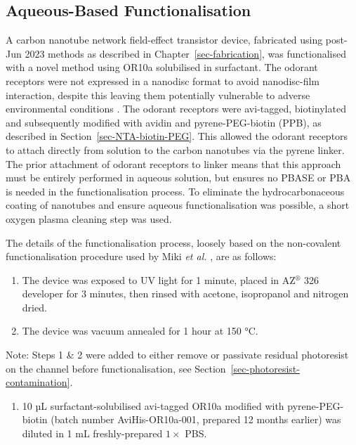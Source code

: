 \documentclass[
  a4paper,
]{scrbook}
\providecommand{\tightlist}{%
  \setlength{\itemsep}{0pt}\setlength{\parskip}{0pt}}\usepackage{longtable,booktabs,array}
\begin{document}
\hypertarget{sec-aqueous-functionalisation}{%
\subsection{Aqueous-Based
Functionalisation}\label{sec-aqueous-functionalisation}}

A carbon nanotube network field-effect transistor device, fabricated
using post-Jun 2023 methods as described in
Chapter~\ref{sec-fabrication}, was functionalised with a novel method
using OR10a solubilised in surfactant. The odorant receptors were not
expressed in a nanodisc format to avoid nanodisc-film interaction,
despite this leaving them potentially vulnerable to adverse
environmental conditions \autocite{Nath2007,Bayburt2010}. The odorant
receptors were avi-tagged, biotinylated and subsequently modified with
avidin and pyrene-PEG-biotin (PPB), as described in
Section~\ref{sec-NTA-biotin-PEG}. This allowed the odorant receptors to
attach directly from solution to the carbon nanotubes via the pyrene
linker. The prior attachment of odorant receptors to linker means that
this approach must be entirely performed in aqueous solution, but
ensures no PBASE or PBA is needed in the functionalisation process. To
eliminate the hydrocarbonaceous coating of nanotubes and ensure aqueous
functionalisation was possible, a short oxygen plasma cleaning step was
used.

The details of the functionalisation process, loosely based on the
non-covalent functionalisation procedure used by Miki \emph{et al.}
\autocite{Miki2019}, are as follows:

\begin{enumerate}
\def\labelenumi{\arabic{enumi}.}
\item
  The device was exposed to UV light for 1 minute, placed in
  AZ\(^\circledR\) 326 developer for 3 minutes, then rinsed with
  acetone, isopropanol and nitrogen dried.
\item
  The device was vacuum annealed for 1 hour at 150 °C.
\end{enumerate}

Note: Steps 1 \& 2 were added to either remove or passivate residual
photoresist on the channel before functionalisation, see
Section~\ref{sec-photoresist-contamination}.

\begin{enumerate}
\def\labelenumi{\arabic{enumi}.}
\setcounter{enumi}{2}
\tightlist
\item
  10 µL surfactant-solubilised avi-tagged OR10a modified with
  pyrene-PEG-biotin (batch number AviHis-OR10a-001, prepared 12 months
  earlier) was diluted in 1 mL freshly-prepared \(1 \times\) PBS.
\end{enumerate}
\end{document}
